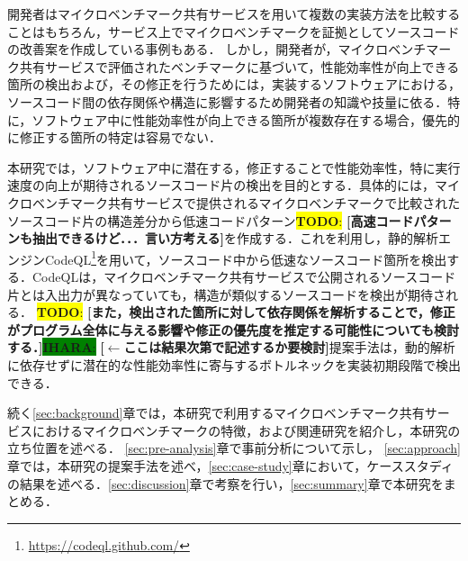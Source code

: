 \documentclass[submit,techrep,noauthor]{ipsj}
\newcommand{\todo}[1]{\colorbox{yellow}{{\bf TODO}:}{\color{red} {\textbf{[#1]}}}}
\newcommand{\ihara}[1]{\colorbox{green}{{\bf IHARA}:}{\color{blue} {\textbf{[#1]}}}}
\begin{document}
開発者はマイクロベンチマーク共有サービスを用いて複数の実装方法を比較することはもちろん，サービス上でマイクロベンチマークを証拠としてソースコードの改善案を作成している事例もある\cite{saiki}．
しかし，開発者が，マイクロベンチマーク共有サービスで評価されたベンチマークに基づいて，性能効率性が向上できる箇所の検出および，その修正を行うためには，実装するソフトウェアにおける，ソースコード間の依存関係や構造に影響するため開発者の知識や技量に依る．特に，ソフトウェア中に性能効率性が向上できる箇所が複数存在する場合，優先的に修正する箇所の特定は容易でない．


本研究では，ソフトウェア中に潜在する，修正することで性能効率性，特に実行速度の向上が期待されるソースコード片の検出を目的とする．具体的には，マイクロベンチマーク共有サービスで提供されるマイクロベンチマークで比較されたソースコード片の構造差分から低速コードパターン\todo{高速コードパターンも抽出できるけど．．．言い方考える}を作成する．これを利用し，静的解析エンジンCodeQL\footnote{\url{https://codeql.github.com/}}\cite{ql}を用いて，ソースコード中から低速なソースコード箇所を検出する．CodeQLは，マイクロベンチマーク共有サービスで公開されるソースコード片とは入出力が異なっていても，構造が類似するソースコードを検出が期待される．
\todo{また，検出された箇所に対して依存関係を解析することで，修正がプログラム全体に与える影響や修正の優先度を推定する可能性についても検討する．}\ihara{$\leftarrow$ここは結果次第で記述するか要検討}提案手法は，動的解析に依存せずに潜在的な性能効率性に寄与するボトルネックを実装初期段階で検出できる．

続く\ref{sec:background}章では，本研究で利用するマイクロベンチマーク共有サービスにおけるマイクロベンチマークの特徴，および関連研究を紹介し，本研究の立ち位置を述べる． \ref{sec:pre-analysis}章で事前分析について示し， \ref{sec:approach}章では，本研究の提案手法を述べ，\ref{sec:case-study}章において，ケーススタディの結果を述べる．\ref{sec:discussion}章で考察を行い，\ref{sec:summary}章で本研究をまとめる． 
\end{document}
